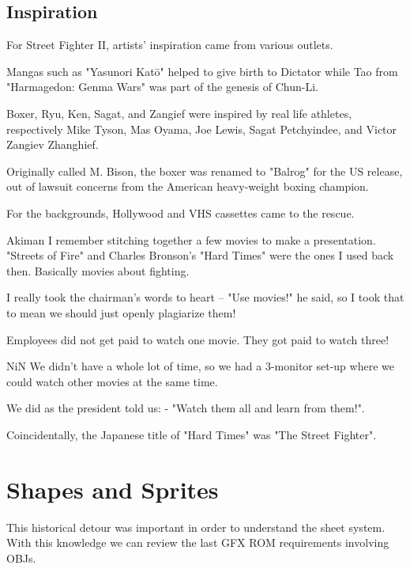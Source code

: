 \subsection{Inspiration}
For Street Fighter II, artists' inspiration came from various outlets. 

Mangas such as "Yasunori Katō" helped to give birth to Dictator while Tao from "Harmagedon: Genma Wars" was part of the genesis of Chun-Li. 

Boxer, Ryu, Ken, Sagat, and Zangief were inspired by real life athletes, respectively Mike Tyson, Mas Oyama, Joe Lewis, Sagat Petchyindee, and Victor Zangiev Zhanghief.

\begin{trivia}
Originally called M. Bison, the boxer was renamed to "Balrog" for the US release, out of lawsuit concerns from the American heavy-weight boxing champion. 
\end{trivia}

For the backgrounds, Hollywood and VHS cassettes came to the rescue.

\begin{q}{Akiman\cite{ffdevinterview}}
I remember stitching together a few movies to make a presentation. "Streets of Fire" and Charles Bronson’s "Hard Times" were the ones I used back then. Basically movies about fighting. 

I really took the chairman’s words to heart – "Use movies!" he said, so I took that to mean we should just openly plagiarize them!
\end{q}

Employees did not get paid to watch one movie. They got paid to watch three!

\begin{q}{NiN\cite{ffdevinterview}}
We didn't have a whole lot of time, so we had a 3-monitor set-up where we could watch other movies at the same time.

We did as the president told us: - "Watch them all and learn from them!".
\end{q}

\begin{trivia}
Coincidentally, the Japanese title of "Hard Times" was "The Street Fighter".
\end{trivia}


\section{Shapes and Sprites}
This historical detour was important in order to understand the sheet system. With this knowledge we can review the last GFX ROM requirements involving OBJs.  

